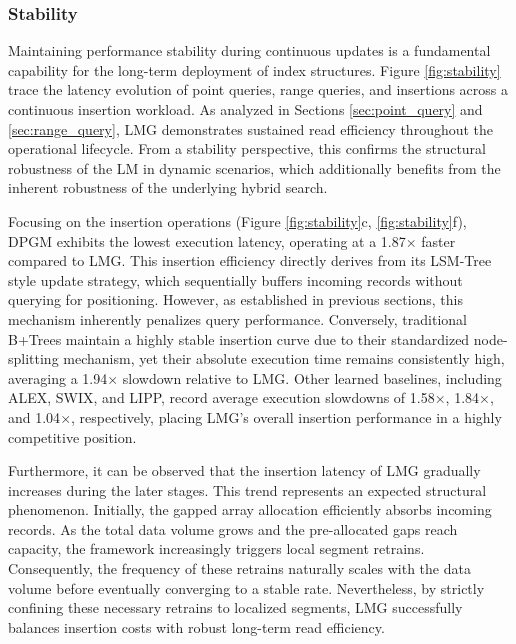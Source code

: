 \subsubsection{Stability}
\label{sec:stability}
Maintaining performance stability during continuous updates is a fundamental capability for the long-term deployment of index structures. Figure \ref{fig:stability} trace the latency evolution of point queries, range queries, and insertions across a continuous insertion workload. As analyzed in Sections \ref{sec:point_query} and \ref{sec:range_query}, LMG demonstrates sustained read efficiency throughout the operational lifecycle. From a stability perspective, this confirms the structural robustness of the LM in dynamic scenarios, which additionally benefits from the inherent robustness of the underlying hybrid search.

Focusing on the insertion operations (Figure \ref{fig:stability}c, \ref{fig:stability}f), DPGM exhibits the lowest execution latency, operating at a 1.87$\times$ faster compared to LMG. This insertion efficiency directly derives from its LSM-Tree style update strategy, which sequentially buffers incoming records without querying for positioning. However, as established in previous sections, this mechanism inherently penalizes query performance. Conversely, traditional B+Trees maintain a highly stable insertion curve due to their standardized node-splitting mechanism, yet their absolute execution time remains consistently high, averaging a 1.94$\times$ slowdown relative to LMG. Other learned baselines, including ALEX, SWIX, and LIPP, record average execution slowdowns of 1.58$\times$, 1.84$\times$, and 1.04$\times$, respectively, placing LMG's overall insertion performance in a highly competitive position.

Furthermore, it can be observed that the insertion latency of LMG gradually increases during the later stages. This trend represents an expected structural phenomenon. Initially, the gapped array allocation efficiently absorbs incoming records. As the total data volume grows and the pre-allocated gaps reach capacity, the framework increasingly triggers local segment retrains. Consequently, the frequency of these retrains naturally scales with the data volume before eventually converging to a stable rate. Nevertheless, by strictly confining these necessary retrains to localized segments, LMG successfully balances insertion costs with robust long-term read efficiency.

